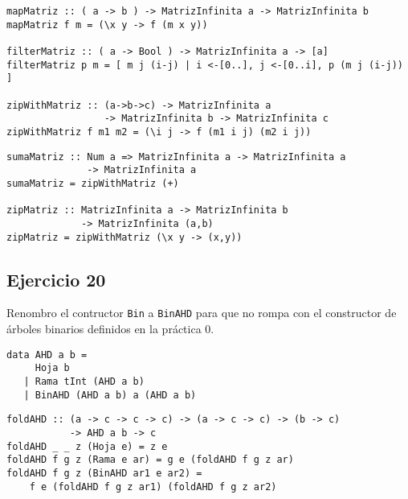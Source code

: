\begin{centrado}
    \begin{verbatim}
mapMatriz :: ( a -> b ) -> MatrizInfinita a -> MatrizInfinita b
mapMatriz f m = (\x y -> f (m x y))

filterMatriz :: ( a -> Bool ) -> MatrizInfinita a -> [a]
filterMatriz p m = [ m j (i-j) | i <-[0..], j <-[0..i], p (m j (i-j)) ]

zipWithMatriz :: (a->b->c) -> MatrizInfinita a 
                 -> MatrizInfinita b -> MatrizInfinita c
zipWithMatriz f m1 m2 = (\i j -> f (m1 i j) (m2 i j))
    \end{verbatim}
\end{centrado}

\begin{centrado}
    \begin{verbatim}
sumaMatriz :: Num a => MatrizInfinita a -> MatrizInfinita a 
              -> MatrizInfinita a
sumaMatriz = zipWithMatriz (+)

zipMatriz :: MatrizInfinita a -> MatrizInfinita b 
             -> MatrizInfinita (a,b)
zipMatriz = zipWithMatriz (\x y -> (x,y))
    \end{verbatim}
\end{centrado}

\subsection{Ejercicio 20}
Renombro el contructor \texttt{Bin} a \texttt{BinAHD} para que no rompa con el constructor de árboles binarios definidos en la práctica 0.
\begin{centrado}
    \begin{verbatim}
data AHD a b = 
     Hoja b 
   | Rama tInt (AHD a b)
   | BinAHD (AHD a b) a (AHD a b)
    \end{verbatim}
\end{centrado}

\begin{centrado}
    \begin{verbatim}
foldAHD :: (a -> c -> c -> c) -> (a -> c -> c) -> (b -> c) 
           -> AHD a b -> c
foldAHD _ _ z (Hoja e) = z e
foldAHD f g z (Rama e ar) = g e (foldAHD f g z ar)
foldAHD f g z (BinAHD ar1 e ar2) =
    f e (foldAHD f g z ar1) (foldAHD f g z ar2)
    \end{verbatim}
\end{centrado}

